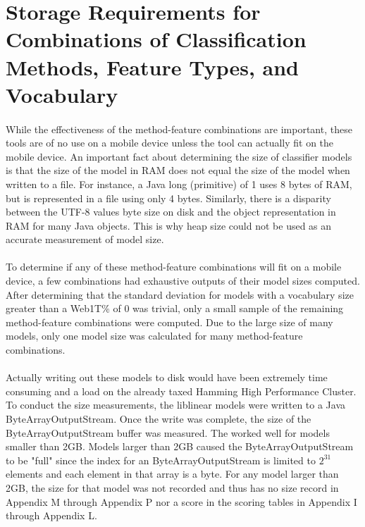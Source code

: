 \section{Storage Requirements for Combinations of Classification Methods, Feature Types, and Vocabulary}
	\paragraph*{} While the effectiveness of the method-feature combinations are important, these tools are of no use on a mobile device unless the tool can actually fit on the mobile device.  An important fact about determining the size of classifier models is that the size of the model in RAM does not equal the size of the model when written to a file.  For instance, a Java long (primitive) of 1 uses 8 bytes of RAM, but is represented in a file using only 4 bytes.  Similarly, there is a disparity between the UTF-8 values byte size on disk and the object representation in RAM for many Java objects.  This is why heap size could not be used as an accurate measurement of model size.
	\paragraph*{}To determine if any of these method-feature combinations will fit on a mobile device, a few combinations had exhaustive outputs of their model sizes computed.  After determining that the standard deviation for models with a vocabulary size greater than a Web1T\% of 0 was trivial, only a small sample of the remaining method-feature combinations were computed.  Due to the large size of many models, only one model size was calculated for many method-feature combinations.  
	\paragraph*{} Actually writing out these models to disk would have been extremely time consuming and a load on the already taxed Hamming High Performance Cluster.  To conduct the size measurements, the liblinear models were written to a Java ByteArrayOutputStream.  Once the write was complete, the size of the ByteArrayOutputStream buffer was measured.  The worked well for models smaller than 2GB.  Models larger than 2GB caused the ByteArrayOutputStream to be "full" since the index for an ByteArrayOutputStream is limited to $2^31$ elements and each element in that array is a byte.  For any model larger than 2GB, the size for that model was not recorded and thus has no size record in Appendix M through Appendix P nor a score in the scoring tables in Appendix I through Appendix L.
